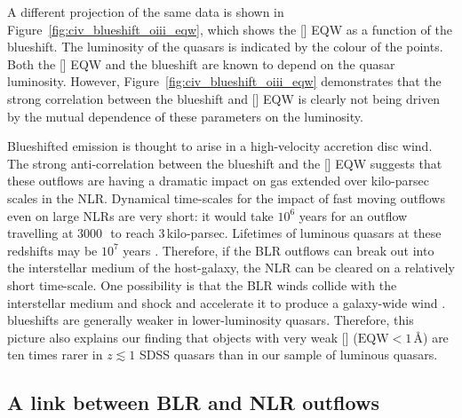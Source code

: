 A different projection of the same data is shown in Figure~\ref{fig:civ_blueshift_oiii_eqw}, which shows the [] EQW as a function of the  blueshift.  
The luminosity of the quasars is indicated by the colour of the points. 
Both the [] EQW and the  blueshift are known to depend on the quasar luminosity. 
However, Figure~\ref{fig:civ_blueshift_oiii_eqw} demonstrates that the strong correlation between the  blueshift and [] EQW is clearly not being driven by the mutual dependence of these parameters on the luminosity. 

Blueshifted  emission is thought to arise in a high-velocity accretion disc wind.
The strong anti-correlation between the  blueshift and the [] EQW suggests that these outflows are having a dramatic impact on gas extended over kilo-parsec scales in the NLR.
Dynamical time-scales for the impact of fast moving outflows even on large NLRs are very short: it would take $10^6$ years for an outflow travelling at $3000$\,\kms\, to reach $3$\,kilo-parsec. 
Lifetimes of luminous quasars at these redshifts may be $10^7$ years \citep[e.g.][]{martini01}. 
Therefore, if the BLR outflows can break out into the interstellar medium of the host-galaxy, the NLR can be cleared on a relatively short time-scale.
One possibility is that the BLR winds collide with the interstellar medium and shock and accelerate it to produce a galaxy-wide wind \citep[e.g.][]{king11,faucher12}. 
 blueshifts are generally weaker in lower-luminosity quasars. 
Therefore, this picture also explains our finding that objects with very weak [] ($\text{EQW} < 1$\,\AA) are ten times rarer in $z \lesssim 1$ SDSS quasars than in our sample of luminous quasars.   

\subsection{A link between BLR and NLR outflows}

